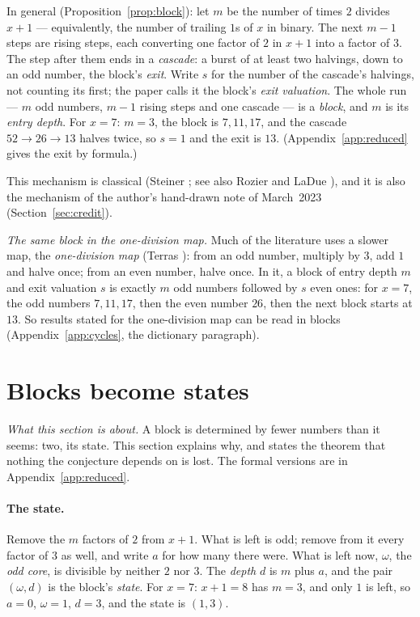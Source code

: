 \documentclass[11pt]{article}
\theoremstyle{remark}
\newcommand{\w}{\omega}
\begin{document}
In general (Proposition~\ref{prop:block}): let $m$ be the number of times $2$ divides $x+1$ --- equivalently, the number of trailing $1$s of $x$ in binary. The next $m - 1$ steps are rising steps, each converting one factor of $2$ in $x+1$ into a factor of $3$. The step after them ends in a \emph{cascade}: a burst of at least two halvings, down to an odd number, the block's \emph{exit}. Write $s$ for the number of the cascade's halvings, not counting its first; the paper calls it the block's \emph{exit valuation}. The whole run --- $m$ odd numbers, $m-1$ rising steps and one cascade --- is a \emph{block}, and $m$ is its \emph{entry depth}. For $x = 7$: $m = 3$, the block is $7, 11, 17$, and the cascade $52 \to 26 \to 13$ halves twice, so $s = 1$ and the exit is $13$. (Appendix~\ref{app:reduced} gives the exit by formula.)

This mechanism is classical (Steiner \cite{steiner}; see also Rozier \cite{rozier90} and LaDue \cite{ladue}), and it is also the mechanism of the author's hand-drawn note of March~2023 (Section~\ref{sec:credit}).

\emph{The same block in the one-division map.} Much of the literature uses a slower map, the \emph{one-division map} (Terras \cite{terras}): from an odd number, multiply by $3$, add $1$ and halve once; from an even number, halve once. In it, a block of entry depth $m$ and exit valuation $s$ is exactly $m$ odd numbers followed by $s$ even ones: for $x = 7$, the odd numbers $7, 11, 17$, then the even number $26$, then the next block starts at $13$. So results stated for the one-division map can be read in blocks (Appendix~\ref{app:cycles}, the dictionary paragraph).

\section{Blocks become states}\label{sec:reduced}

\emph{What this section is about.} A block is determined by fewer numbers than it seems: two, its state. This section explains why, and states the theorem that nothing the conjecture depends on is lost. The formal versions are in Appendix~\ref{app:reduced}.

\paragraph{The state.} Remove the $m$ factors of $2$ from $x+1$. What is left is odd; remove from it every factor of $3$ as well, and write $a$ for how many there were. What is left now, $\w$, the \emph{odd core}, is divisible by neither $2$ nor $3$. The \emph{depth} $d$ is $m$ plus $a$, and the pair $(\w, d)$ is the block's \emph{state}. For $x = 7$: $x + 1 = 8$ has $m = 3$, and only $1$ is left, so $a = 0$, $\w = 1$, $d = 3$, and the state is $(1,3)$.
\end{document}
